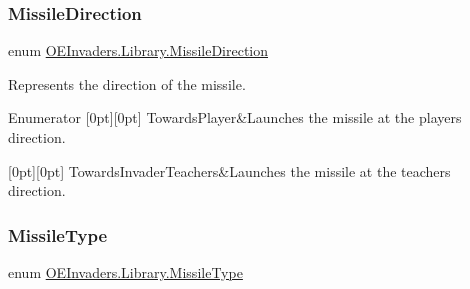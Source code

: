 \subsubsection{\texorpdfstring{MissileDirection}{MissileDirection}}
{\footnotesize\ttfamily enum \mbox{\hyperlink{namespace_o_e_invaders_1_1_library_abefe34068a8894fb3391a5f1e315edcd}{O\+E\+Invaders.\+Library.\+Missile\+Direction}}\hspace{0.3cm}{\ttfamily [strong]}}



Represents the direction of the missile. 

\begin{DoxyEnumFields}{Enumerator}
[0pt][0pt]{}\mbox{\label{namespace_o_e_invaders_1_1_library_abefe34068a8894fb3391a5f1e315edcdad6bc5cf14da037d5fec3094b23338716}} 
Towards\+Player&Launches the missile at the player\textquotesingle{}s direction. \\
\hline

[0pt][0pt]{}\mbox{\label{namespace_o_e_invaders_1_1_library_abefe34068a8894fb3391a5f1e315edcda053cf475f88a27bafd7c94146918e99a}} 
Towards\+Invader\+Teachers&Launches the missile at the teachers direction. \\
\hline

\end{DoxyEnumFields}
\mbox{\label{namespace_o_e_invaders_1_1_library_a54c0ac5ddd321d308d59e807a9a6d83b}} 
\subsubsection{\texorpdfstring{MissileType}{MissileType}}
{\footnotesize\ttfamily enum \mbox{\hyperlink{namespace_o_e_invaders_1_1_library_a54c0ac5ddd321d308d59e807a9a6d83b}{O\+E\+Invaders.\+Library.\+Missile\+Type}}\hspace{0.3cm}{\ttfamily [strong]}}



